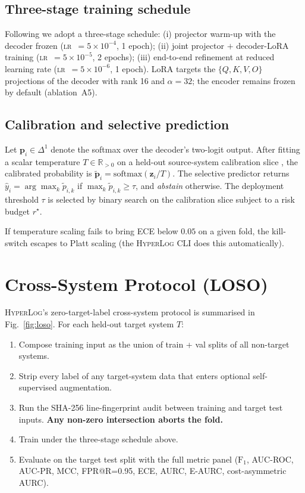 \documentclass[journal, twoside]{IEEEtran}
\newcommand{\hylog}{\textsc{HyperLog}}
\newcommand{\loso}{\textsc{LOSO}}
\newcommand{\ece}{\textsc{ECE}}
\newcommand{\aurc}{\textsc{AURC}}
\newcommand{\eaurc}{\textsc{E-AURC}}
\newcommand{\fone}{$\text{F}_1$}
\begin{document}
\subsection{Three-stage training schedule}

Following \cite{logllm2024} we adopt a three-stage schedule:
(i) projector warm-up with the decoder frozen
(\textsc{lr}~$=5\!\times\!10^{-4}$, 1 epoch);
(ii) joint projector $+$ decoder-LoRA training
(\textsc{lr}~$=5\!\times\!10^{-5}$, 2 epochs);
(iii) end-to-end refinement at reduced learning rate
(\textsc{lr}~$=5\!\times\!10^{-6}$, 1 epoch).
LoRA targets the $\{Q, K, V, O\}$ projections of the decoder with rank
16 and $\alpha = 32$; the encoder remains frozen by default
(ablation~A5).

\subsection{Calibration and selective prediction}\label{sec:method:cal}

Let $\mathbf{p}_i \in \Delta^1$ denote the softmax over the decoder's
two-logit output. After fitting a scalar temperature
$T \in \mathbb{R}_{>0}$ on a held-out source-system calibration slice
\cite{guo2017}, the calibrated probability is
$\tilde{\mathbf{p}}_i = \mathrm{softmax}(\mathbf{z}_i / T)$.
The selective predictor returns
$\hat{y}_i = \arg\max_k \tilde{p}_{i,k}$ if
$\max_k \tilde{p}_{i,k} \ge \tau$, and \textit{abstain} otherwise.
The deployment threshold $\tau$ is selected by binary search on the
calibration slice subject to a risk budget $r^\star$.

If temperature scaling fails to bring \ece{} below $0.05$ on a
given fold, the kill-switch escapes to Platt scaling (the
\hylog{} CLI does this automatically).

\section{Cross-System Protocol (\loso)}\label{sec:protocol}

\hylog{}'s zero-target-label cross-system protocol is summarised in
Fig.~\ref{fig:loso}. For each held-out target system $T$:

\begin{enumerate}
\item Compose training input as the union of train + val splits of all
non-target systems.
\item Strip every label of any target-system data that enters
optional self-supervised augmentation.
\item Run the SHA-256 line-fingerprint audit between training and
target test inputs. \textbf{Any non-zero intersection aborts the
fold.}
\item Train under the three-stage schedule above.
\item Evaluate on the target test split with the full metric panel
(\fone, AUC-ROC, AUC-PR, MCC, FPR@R=0.95, \ece{}, \aurc{},
\eaurc{}, cost-asymmetric \aurc{}).
\end{enumerate}
\end{document}
